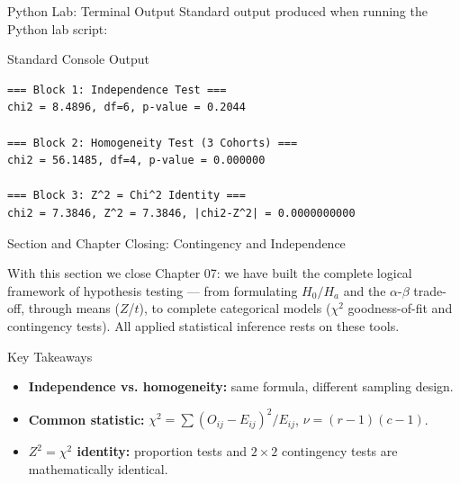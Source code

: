\documentclass[10pt, aspectratio=169]{beamer}
\begin{document}
\begin{frame}[fragile]{Python Lab: Terminal Output}
  \scriptsize
  Standard output produced when running the Python lab script:
  \vspace{0.02cm}
  \begin{block}{Standard Console Output}
    \fontsize{4pt}{5pt}\selectfont
    \begin{verbatim}
=== Block 1: Independence Test ===
chi2 = 8.4896, df=6, p-value = 0.2044

=== Block 2: Homogeneity Test (3 Cohorts) ===
chi2 = 56.1485, df=4, p-value = 0.000000

=== Block 3: Z^2 = Chi^2 Identity ===
chi2 = 7.3846, Z^2 = 7.3846, |chi2-Z^2| = 0.0000000000
    \end{verbatim}
  \end{block}
\end{frame}


\begin{frame}{Section and Chapter Closing: Contingency and Independence}
  \begin{reflexion}
    With this section we close Chapter 07: we have built the complete logical framework of hypothesis testing --- from formulating $H_0/H_a$ and the $\alpha$-$\beta$ trade-off, through means ($Z$/$t$), to complete categorical models ($\chi^2$ goodness-of-fit and contingency tests). All applied statistical inference rests on these tools.
  \end{reflexion}

  \vspace{0.2cm}
  \pause
  \begin{block}{Key Takeaways}
    \begin{itemize}\itemsep=0.08cm
      \item \textbf{Independence vs. homogeneity:} same formula, different sampling design.
      \item \textbf{Common statistic:} $\chi^2=\sum(O_{ij}-E_{ij})^2/E_{ij}$, $\nu=(r-1)(c-1)$.
      \item \textbf{$Z^2=\chi^2$ identity:} proportion tests and $2\times2$ contingency tests are mathematically identical.
    \end{itemize}
  \end{block}
\end{frame}
\end{document}
